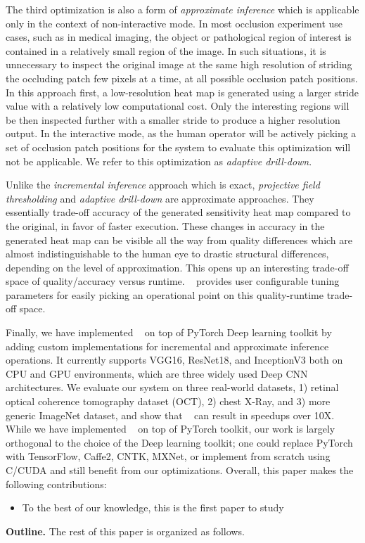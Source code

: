The third optimization is also a form of \textit{approximate inference} which is applicable only in the context of non-interactive mode.
In most occlusion experiment use cases, such as in medical imaging, the object or pathological region of interest is contained in a relatively small region of the image.
In such situations, it is unnecessary to inspect the original image at the same high resolution of striding the occluding patch few pixels at a time, at all possible occlusion patch positions.
In this approach first, a low-resolution heat map is generated using a larger stride value with a relatively low computational cost.
Only the interesting regions will be then inspected further with a smaller stride to produce a higher resolution output.
In the interactive mode, as the human operator will be actively picking a set of occlusion patch positions for the system to evaluate this optimization will not be applicable.
We refer to this optimization as \textit{adaptive drill-down}.


Unlike the \textit{incremental inference} approach which is exact, \textit{projective field thresholding} and \textit{adaptive drill-down} are approximate approaches. They essentially trade-off accuracy of the generated sensitivity heat map compared to the original, in favor of faster execution.
These changes in accuracy in the generated heat map can be visible all the way from quality differences which are almost indistinguishable to the human eye to drastic structural differences, depending on the level of approximation.
This opens up an interesting trade-off space of quality/accuracy versus runtime. \system~ provides user configurable tuning parameters for easily picking an operational point on this quality-runtime trade-off space.

Finally, we have implemented \system~ on top of PyTorch Deep learning toolkit  by adding custom implementations for incremental and approximate inference operations.
It currently supports VGG16, ResNet18, and InceptionV3 both on CPU and GPU environments, which are three widely used Deep CNN architectures.
We evaluate our system on three real-world datasets, 1) retinal optical coherence tomography dataset (OCT), 2) chest X-Ray, and 3) more generic ImageNet dataset, and show that \system~ can result in speedups over 10X.
While we have implemented \system~ on top of PyTorch toolkit, our work is largely orthogonal to the choice of the Deep learning toolkit; one could replace PyTorch with TensorFlow, Caffe2, CNTK, MXNet, or implement from scratch using C/CUDA and still benefit from our optimizations.
Overall, this paper makes the following contributions:

\begin{itemize}
	\item To the best of our knowledge, this is the first paper to study
\end{itemize}

\vspace{2mm}
\noindent \textbf{Outline.} The rest of this paper is organized as follows.
